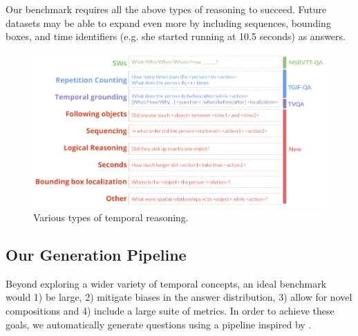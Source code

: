 \documentclass[10pt,twocolumn,letterpaper]{article}
\newcommand{\mgm}[1]{{\color{cyan}{mgm: #1}}}
\begin{document}

 
Our benchmark requires all the above types of reasoning to succeed. Future datasets may be able to expand even more by including sequences, bounding boxes, and time identifiers (e.g. she started running at 10.5 seconds) as answers.


\begin{figure}[t]
\begin{center}
\includegraphics[width=0.8\linewidth]{Figures/figure_reasoning.png}
\end{center}
   \caption{Various types of temporal reasoning.}
\label{fig:long}
\label{fig:onecol}
\end{figure}


\subsection{Our Generation Pipeline}
Beyond exploring a wider variety of temporal concepts, an ideal benchmark would 1) be large, 2) mitigate biases in the answer distribution, 3) allow for novel compositions and 4) include a large suite of metrics. In order to achieve these goals, we automatically generate questions using a pipeline inspired by \cite{hudson2019gqa}.
\end{document}
